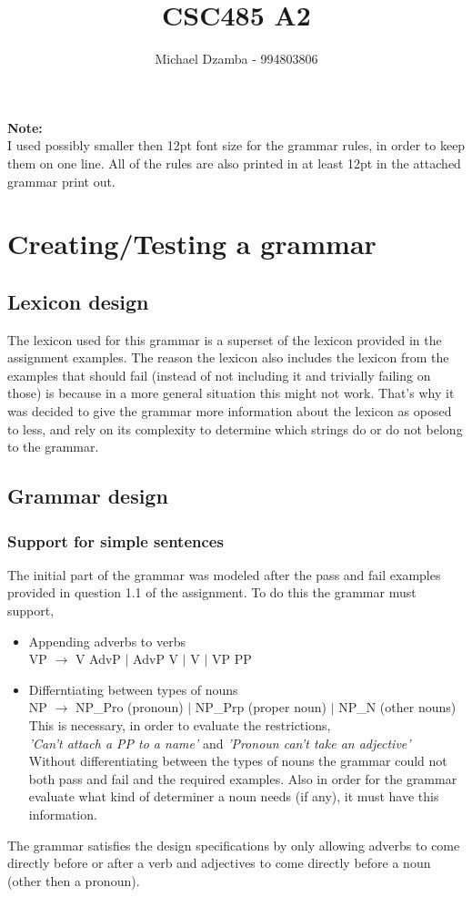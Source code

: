 \documentclass{article}
\author{Michael Dzamba - 994803806}
\title{CSC485 A2}
\begin{document}
\maketitle

\textbf{Note:}\\
I used possibly smaller then 12pt font size for the grammar rules, in order to keep them on one line. All of the rules are also printed in at least 12pt in the attached grammar print out.\\
\section{Creating/Testing a grammar}
\subsection{Lexicon design}
The lexicon used for this grammar is a superset of the lexicon provided in the assignment examples. The reason the lexicon also includes the lexicon from the examples that should fail (instead of not including it and trivially failing on those) is because in a more general situation this might not work. That's why it was decided to give the grammar more information about the lexicon as oposed to less, and rely on its complexity to determine which strings do or do not belong to the grammar.
\subsection{Grammar design}
\subsubsection{Support for simple sentences}
\label{simple sentences}
The initial part of the grammar was modeled after the pass and fail examples provided in question 1.1 of the assignment. To do this the grammar must support,
\begin{itemize}
\item Appending adverbs to verbs\\
\tiny VP $\rightarrow$ V AdvP $|$ AdvP V $|$ V $|$ VP PP \normalsize
\item Differntiating between types of nouns\\
\tiny NP $\rightarrow$ NP\_Pro (pronoun) $|$ NP\_Prp (proper noun) $|$ NP\_N (other nouns) \normalsize \\
This is necessary, in order to evaluate the restrictions,\\
\textit{'Can't attach a PP to a name'} and \textit{'Pronoun can't take an adjective'}\\
Without differentiating between the types of nouns the grammar could not both pass and fail and the required examples. Also in order for the grammar evaluate what kind of determiner a noun needs (if any), it must have this information.
\end{itemize}
The grammar satisfies the design specifications by only allowing adverbs to come directly before or after a verb and adjectives to come directly before a noun (other then a pronoun).
\end{document}
